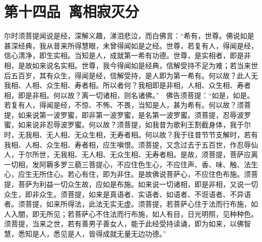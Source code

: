 \documentclass[12pt,twoside,openany]{book}
\begin{document}
\chapter{第十四品\ 离相寂灭分}
尔时须菩提闻说是经，深解义趣，涕泪悲泣，而白佛言：“希有，世尊。佛说如是甚深经典，我从昔来所得慧眼，未曾得闻如是之经。世尊，若复有人，得闻是经，信心清净，即生实相。当知是人，成就第一希有功德。世尊，是实相者，即是非相，是故如来说名实相。世尊，我今得闻如是经典，信解受持不足为难；若当来世后五百岁，其有众生，得闻是经，信解受持，是人即为第一希有。何以故？此人无我相、人相、众生相、寿者相。所以者何？我相即是非相，人相、众生相、寿者相，即是非相。何以故？离一切诸相，则名诸佛。”　佛告须菩提：“如是，如是。若复有人，得闻是经，不惊、不怖、不畏，当知是人，甚为希有。何以故？须菩提，如来说第一波罗蜜，即非第一波罗蜜，是名第一波罗蜜。须菩提，忍辱波罗蜜，如来说非忍辱波罗蜜。何以故？须菩提，如我昔为歌利王割截身体，我于尔时，无我相、无人相、无众生相，无寿者相。何以故？我于往昔节节支解时，若有我相、人相、众生相、寿者相，应生嗔恨。须菩提，又念过去于五百世，作忍辱仙人，于尔所世，无我相、无人相、无众生相、无寿者相。是故，须菩提，菩萨应离一切相，发阿耨多罗三藐三菩提心，不应住色生心，不应住声、香、味、触、法生心，应生无所住心。若心有住，即为非住。是故佛说菩萨心，不应住色布施。须菩提，菩萨为利益一切众生故，应如是布施。如来说一切诸相，即是非相，又说一切众生，即非众生。须菩提，如来是真语者、实语者、如语者、不诳语者、不异语者。须菩提，如来所得法，此法无实无虚。须菩提，若菩萨心住于法而行布施，如人入闇，即无所见；若菩萨心不住法而行布施，如人有目，日光明照，见种种色。须菩提，当来之世，若有善男子善女人，能于此经受持读诵，即为如来，以佛智慧，悉知是人，悉见是人，皆得成就无量无边功德。”
\end{document}
